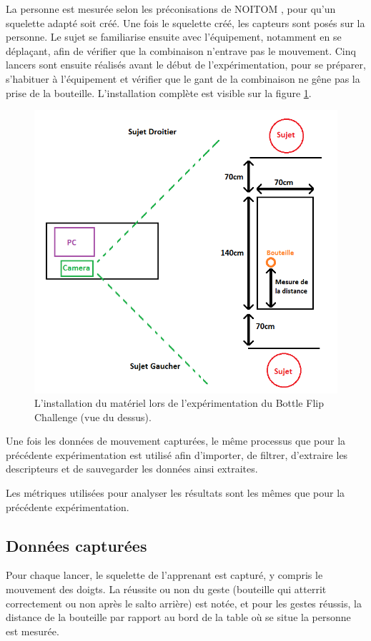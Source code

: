 La personne est mesurée selon les préconisations de NOITOM \parencite{Noitom2015Doc}, pour qu'un squelette adapté soit créé. Une fois le squelette créé, les capteurs sont posés sur la personne. Le sujet se familiarise ensuite avec l'équipement, notamment en se déplaçant, afin de vérifier que la combinaison n'entrave pas le mouvement. Cinq lancers sont ensuite réalisés avant le début de l'expérimentation, pour se préparer, s'habituer à l'équipement et vérifier que le gant de la combinaison ne gêne pas la prise de la bouteille. L'installation complète est visible sur la figure \ref{fig:BFC_diagram}.

\begin{figure}
	\centering
    \includegraphics[width=\textwidth]{pictures/BFC_diagram.png}
    \caption{L'installation du matériel lors de l'expérimentation du Bottle Flip Challenge (vue du dessus).}
    \label{fig:BFC_diagram}
\end{figure}

Une fois les données de mouvement capturées, le même processus que pour la précédente expérimentation est utilisé afin d'importer, de filtrer, d'extraire les descripteurs et de sauvegarder les données ainsi extraites.

Les métriques utilisées pour analyser les résultats sont les mêmes que pour la précédente expérimentation.

\subsection{Données capturées}
Pour chaque lancer, le squelette de l'apprenant est capturé, y compris le mouvement des doigts. La réussite ou non du geste (bouteille qui atterrit correctement ou non après le salto arrière) est notée, et pour les gestes réussis, la distance de la bouteille par rapport au bord de la table où se situe la personne est mesurée.

